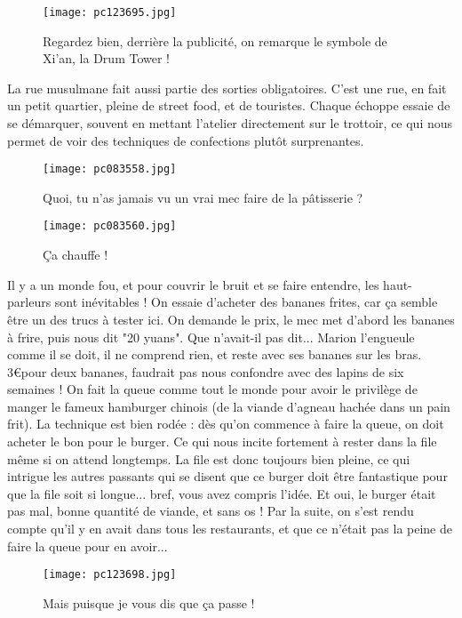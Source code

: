 \documentclass{book}
\begin{document}
\begin{figure}[h]
\centering
\texttt{[image: pc123695.jpg]}
\caption*{Regardez bien, derrière la publicité, on remarque le symbole de Xi'an, la Drum Tower !}
\end{figure}

La rue musulmane fait aussi partie des sorties obligatoires. C'est une rue, en fait un petit quartier, pleine de street food, et de touristes. Chaque échoppe essaie de se démarquer, souvent en mettant l'atelier directement sur le trottoir, ce qui nous permet de voir des techniques de confections plutôt surprenantes.


\begin{figure}[h]
\centering
\texttt{[image: pc083558.jpg]}
\caption*{Quoi, tu n'as jamais vu un vrai mec faire de la pâtisserie ?}
\end{figure}


\begin{figure}[h]
\centering
\texttt{[image: pc083560.jpg]}
\caption*{Ça chauffe !}
\end{figure}

Il y a un monde fou, et pour couvrir le bruit et se faire entendre, les haut-parleurs sont inévitables ! On essaie d'acheter des bananes frites, car ça semble être un des trucs à tester ici. On demande le prix, le mec met d'abord les bananes à frire, puis nous dit "20 yuans". Que n'avait-il pas dit... Marion l'engueule comme il se doit, il ne comprend rien, et reste avec ses bananes sur les bras. 3\euro pour deux bananes, faudrait pas nous confondre avec des lapins de six semaines ! On fait la queue comme tout le monde pour avoir le privilège de manger le fameux hamburger chinois (de la viande d'agneau hachée dans un pain frit). La technique est bien rodée : dès qu'on commence à faire la queue, on doit acheter le bon pour le burger. Ce qui nous incite fortement à rester dans la file même si on attend longtemps. La file est donc toujours bien pleine, ce qui intrigue les autres passants qui se disent que ce burger doit être fantastique pour que la file soit si longue... bref, vous avez compris l'idée. Et oui, le burger était pas mal, bonne quantité de viande, et sans os ! Par la suite, on s'est rendu compte qu'il y en avait dans tous les restaurants, et que ce n'était pas la peine de faire la queue pour en avoir...


\begin{figure}[h]
\centering
\texttt{[image: pc123698.jpg]}
\caption*{Mais puisque je vous dis que ça passe !}
\end{figure}
\end{document}
